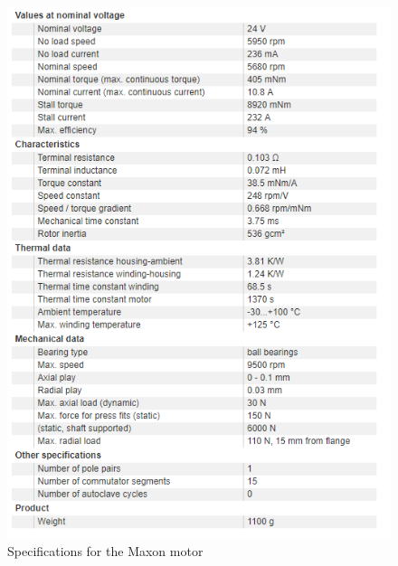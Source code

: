 \documentclass[12pt]{report}
\begin{document}
	\begin{figure}[h] 
		\centering
		\includegraphics[width=\linewidth]{motor_spec}
		\caption{Specifications for the Maxon motor}
		\label{fig:motor_spec}
	\end{figure}
	
\end{document}
